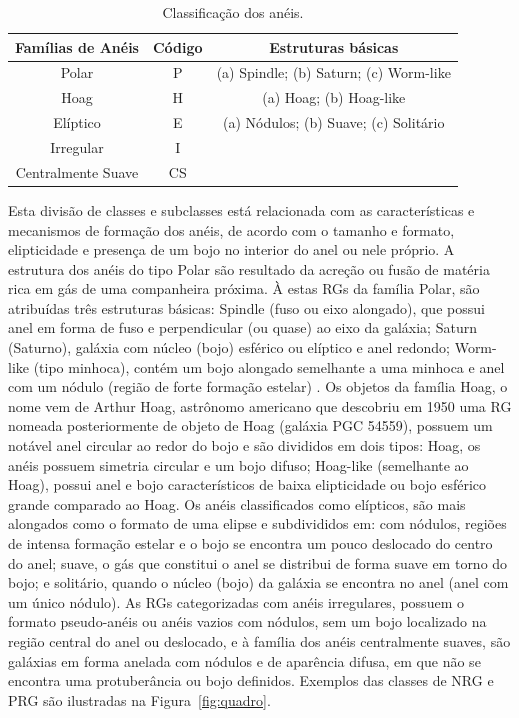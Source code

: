 \begin{table}[h]
  \centering
  \begin{tabular}{ccc}
    \toprule
    \textbf{Famílias de Anéis} & \textbf{Código} & \textbf{Estruturas básicas} \\
    \midrule
    Polar & P & (a) Spindle; (b) Saturn; (c) Worm-like \\
    Hoag & H & (a) Hoag; (b) Hoag-like \\
    Elíptico & E & (a) Nódulos; (b) Suave; (c) Solitário \\
    Irregular & I &  \\
    Centralmente Suave & CS &  \\
    \bottomrule
  \end{tabular}
  \caption{Classificação dos anéis\protect\footnotemark.}
  \label{tab:minha_tabela}
\end{table}

Esta divisão de classes e subclasses está relacionada com as características e mecanismos de formação dos anéis, de acordo com o tamanho e formato, elipticidade e presença de um bojo no interior do anel ou nele próprio. A estrutura dos anéis do tipo Polar são resultado da acreção ou fusão de matéria rica em gás de uma companheira próxima. À estas RGs da família Polar, são atribuídas três estruturas básicas: Spindle (fuso ou eixo alongado), que possui anel em forma de fuso e perpendicular (ou quase) ao eixo da galáxia; Saturn (Saturno), galáxia com núcleo (bojo) esférico ou elíptico e anel redondo; Worm-like (tipo minhoca), contém um bojo alongado semelhante a uma minhoca e anel com um nódulo (região de forte formação estelar) \cite{1998abans}. Os objetos da família Hoag, o nome vem de Arthur Hoag, astrônomo americano que descobriu em 1950 uma RG nomeada posteriormente de objeto de Hoag (galáxia PGC 54559), possuem um notável anel circular ao redor do bojo e são divididos em dois tipos: Hoag, os anéis possuem simetria circular e um bojo difuso; Hoag-like (semelhante ao Hoag), possui anel e bojo característicos de baixa elipticidade ou bojo esférico grande comparado ao Hoag. Os anéis classificados como elípticos, são mais alongados como o formato de uma elipse e subdivididos em: com nódulos, regiões de intensa formação estelar e o bojo se encontra um pouco deslocado do centro do anel; suave, o gás que constitui o anel se distribui de forma suave em torno do bojo; e solitário, quando o núcleo (bojo) da galáxia se encontra no anel (anel com um único nódulo). As RGs categorizadas com anéis irregulares, possuem o formato pseudo-anéis ou anéis vazios com nódulos, sem um bojo localizado na região central do anel ou deslocado, e à família dos anéis centralmente suaves, são galáxias em forma anelada com nódulos e de aparência difusa, em que não se encontra uma protuberância ou bojo definidos. Exemplos das classes de NRG e PRG são ilustradas na Figura~\ref{fig:quadro}.

